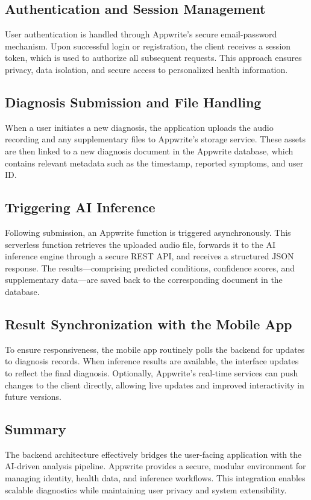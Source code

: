 \subsection{Authentication and Session Management}

User authentication is handled through Appwrite’s secure email-password mechanism. Upon successful login or registration, the client receives a session token, which is used to authorize all subsequent requests. This approach ensures privacy, data isolation, and secure access to personalized health information.

\subsection{Diagnosis Submission and File Handling}

When a user initiates a new diagnosis, the application uploads the audio recording and any supplementary files to Appwrite’s storage service. These assets are then linked to a new diagnosis document in the Appwrite database, which contains relevant metadata such as the timestamp, reported symptoms, and user ID.

\subsection{Triggering AI Inference}

Following submission, an Appwrite function is triggered asynchronously. This serverless function retrieves the uploaded audio file, forwards it to the AI inference engine through a secure REST API, and receives a structured JSON response. The results—comprising predicted conditions, confidence scores, and supplementary data—are saved back to the corresponding document in the database.

\subsection{Result Synchronization with the Mobile App}

To ensure responsiveness, the mobile app routinely polls the backend for updates to diagnosis records. When inference results are available, the interface updates to reflect the final diagnosis. Optionally, Appwrite’s real-time services can push changes to the client directly, allowing live updates and improved interactivity in future versions.

\subsection{Summary}

The backend architecture effectively bridges the user-facing application with the AI-driven analysis pipeline. Appwrite provides a secure, modular environment for managing identity, health data, and inference workflows. This integration enables scalable diagnostics while maintaining user privacy and system extensibility.
